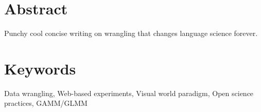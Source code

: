 \section{Abstract}
Punchy cool concise writing on wrangling that changes language science forever.

\lipsum[1]


\section{Keywords}
Data wrangling, Web-based experiments, Visual world paradigm, Open science practices, GAMM/GLMM




